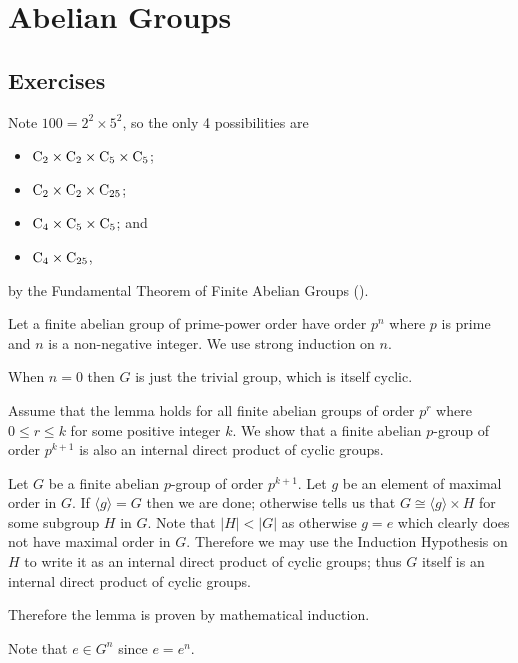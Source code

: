 \section{Abelian Groups}
\subsection*{Exercises}
\begin{questions}
    \item Note $100 = 2^2 \times 5^2$, so the only 4 possibilities are
    \begin{itemize}
        \item $\mathrm{C}_{2} \times \mathrm{C}_{2} \times \mathrm{C}_{5} \times \mathrm{C}_{5}$;
        \item $\mathrm{C}_{2} \times \mathrm{C}_{2} \times \mathrm{C}_{25}$;
        \item $\mathrm{C}_{4} \times \mathrm{C}_{5} \times \mathrm{C}_{5}$; and
        \item $\mathrm{C}_{4} \times \mathrm{C}_{25}$,
    \end{itemize}
    by the Fundamental Theorem of Finite Abelian Groups ().

    \item Let a finite abelian group of prime-power order have order $p^n$ where $p$ is prime and $n$ is a non-negative integer. We use strong induction on $n$.

    When $n = 0$ then $G$ is just the trivial group, which is itself cyclic.

    Assume that the lemma holds for all finite abelian groups of order $p^r$ where $0 \leq r \leq k$ for some positive integer $k$. We show that a finite abelian $p$-group of order $p^{k+1}$ is also an internal direct product of cyclic groups.

    Let $G$ be a finite abelian $p$-group of order $p^{k+1}$. Let $g$ be an element of maximal order in $G$. If $\langle g \rangle = G$ then we are done; otherwise  tells us that $G \cong \langle g \rangle \times H$ for some subgroup $H$ in $G$. Note that $|H| < |G|$ as otherwise $g = e$ which clearly does not have maximal order in $G$. Therefore we may use the Induction Hypothesis on $H$ to write it as an internal direct product of cyclic groups; thus $G$ itself is an internal direct product of cyclic groups.

    Therefore the lemma is proven by mathematical induction.

    \item \begin{partquestions}{\roman*}
        \item Note that $e \in G^n$ since $e = e^n$.


\end{partquestions}
\end{questions}
